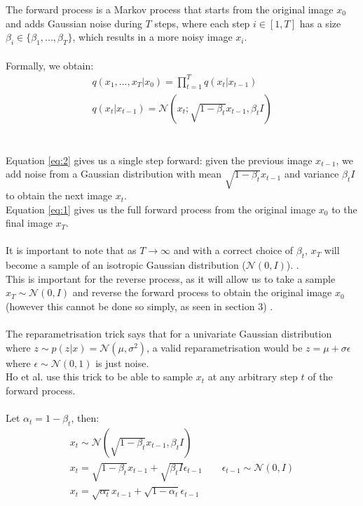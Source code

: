 \documentclass{article}
\begin{document}
The forward process is a Markov process that starts from the original image $x_0$ and adds Gaussian noise during $T$ steps, where each step $i \in \left[1, T\right]$ has a size $\beta_i \in \{ \beta_1, ..., \beta_T \}$, which results in a more noisy image $x_i$. \cite{ho2020denoising}
\\\\
Formally, we obtain:
\begin{gather}
  q\left(x_{1},..., x_{T} | x_0\right) = \prod_{t = 1}^T{q\left(x_t | x_{t - 1}\right)} \label{eq:1} \\
  q\left(x_t | x_{t-1}\right) = \mathcal{N}\left(x_t; \sqrt{1 - \beta_t}x_{t-1}, \beta_t I\right) \label{eq:2}
\end{gather}
\\\\
Equation \ref{eq:2} gives us a single step forward: given the previous image $x_{t-1}$, we add noise from a Gaussian distribution with mean $\sqrt{1 - \beta_t}x_{t-1}$ and variance $\beta_t I$ to obtain the next image $x_t$. \\
Equation \ref{eq:1} gives us the full forward process from the original image $x_0$ to the final image $x_T$.
\\\\
It is important to note that as $T \rightarrow \infty$ and with a correct choice of $\beta_t$,  $x_T$ will become a sample of an isotropic Gaussian distribution ($\mathcal{N}\left(0, I\right)$). \cite{nichol2021improved} \cite{sohldickstein2015deep}. \\
This is important for the reverse process, as it will allow us to take a sample $x_T \sim \mathcal{N}\left(0, I\right)$ and reverse the forward process to obtain the original image $x_0$ (however this cannot be done so simply, as seen in section 3) \cite{nichol2021improved}.
\\\\
The reparametrisation trick says that for a univariate Gaussian distribution where $z \sim p\left(z | x\right) = \mathcal{N}\left(\mu, \sigma^2\right)$, a valid reparametrisation would be $z = \mu + \sigma \epsilon$ where $\epsilon \sim \mathcal{N}\left(0, 1\right)$ is just noise. \cite{kingma2022autoencoding} \\
Ho et al. \cite{ho2020denoising} use this trick to be able to sample $x_t$ at any arbitrary step $t$ of the forward process.
\\\\
Let $\alpha_t = 1 - \beta_t$, then:
\begin{gather*}
  x_t \sim \mathcal{N}\left(\sqrt{1 - \beta_t} x_{t-1}, \beta_t I\right) \\
  x_t = \sqrt{1 - \beta_t} x_{t-1} + \sqrt{\beta_t I} \epsilon_{t-1} \qquad \epsilon_{t - 1} \sim \mathcal{N}\left(0, I\right) \\
  x_t = \sqrt{\alpha_t} x_{t-1} + \sqrt{1 - \alpha_t} \epsilon_{t - 1}
\end{gather*}
\end{document}
